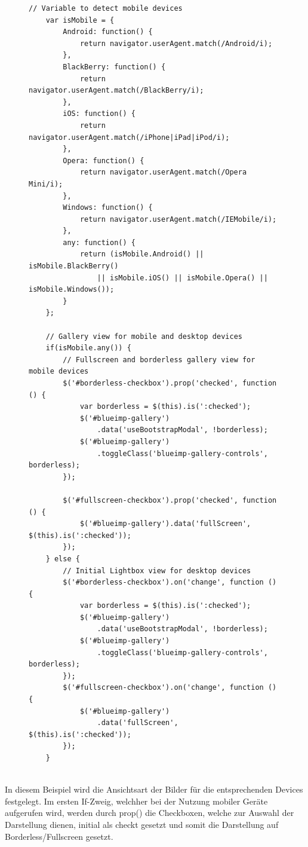 \begin{figure}[h]
	\begin{lstlisting}[caption={Auszug aus app.js (Webclient)}, label=list_client]
	// Variable to detect mobile devices
	var isMobile = {
	    Android: function() {
			return navigator.userAgent.match(/Android/i);
		},
		BlackBerry: function() {
			return navigator.userAgent.match(/BlackBerry/i);
		},
		iOS: function() {
			return navigator.userAgent.match(/iPhone|iPad|iPod/i);
		},
		Opera: function() {
			return navigator.userAgent.match(/Opera Mini/i);
		},
		Windows: function() {
			return navigator.userAgent.match(/IEMobile/i);
		},
		any: function() {
			return (isMobile.Android() || isMobile.BlackBerry()
				|| isMobile.iOS() || isMobile.Opera() || isMobile.Windows());
		}
	};
	
	// Gallery view for mobile and desktop devices
	if(isMobile.any()) {
		// Fullscreen and borderless gallery view for mobile devices
		$('#borderless-checkbox').prop('checked', function () {
			var borderless = $(this).is(':checked');
			$('#blueimp-gallery')
				.data('useBootstrapModal', !borderless);
			$('#blueimp-gallery')
				.toggleClass('blueimp-gallery-controls', borderless);
		});
	
		$('#fullscreen-checkbox').prop('checked', function () {
			$('#blueimp-gallery').data('fullScreen', $(this).is(':checked'));
		});
	} else {
		// Initial Lightbox view for desktop devices
		$('#borderless-checkbox').on('change', function () {
			var borderless = $(this).is(':checked');
			$('#blueimp-gallery')
				.data('useBootstrapModal', !borderless);
			$('#blueimp-gallery')
				.toggleClass('blueimp-gallery-controls', borderless);
		});
		$('#fullscreen-checkbox').on('change', function () {
			$('#blueimp-gallery')
				.data('fullScreen', $(this).is(':checked'));
		});
	}
	
	\end{lstlisting}
\end{figure}

In diesem Beispiel wird die Ansichtsart der Bilder für die entsprechenden Devices 
festgelegt. Im ersten If-Zweig, welchher bei der Nutzung mobiler Geräte aufgerufen 
wird, werden durch prop() die Checkboxen, welche zur Auswahl der Darstellung 
dienen, initial als checkt gesetzt und somit die Darstellung auf Borderless/Fullscreen 
gesetzt.
